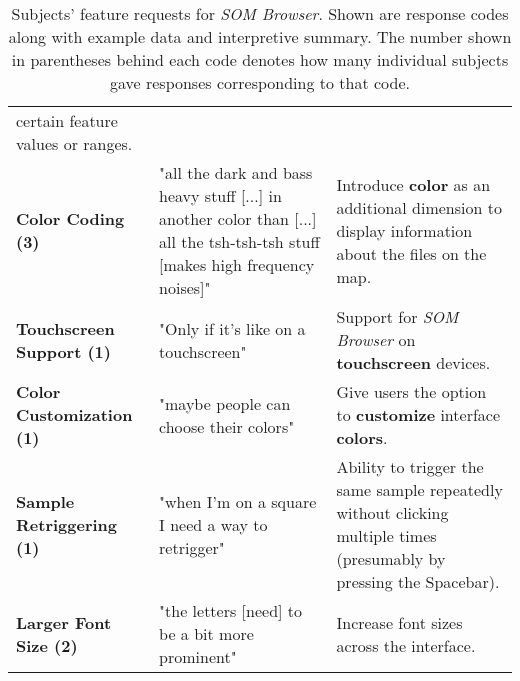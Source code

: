 \begin{table}[!htb]
{\begin{tabular}{ p{4.0cm} p{4.75cm} p{4.75cm} }
    certain feature values or ranges.
    \\
    \textbf{Color Coding (3)}
    &
    "all the dark and bass heavy stuff [...] in another color than [...] all the
    tsh-tsh-tsh stuff [makes high frequency noises]"
    &
    Introduce \textbf{color} as an additional dimension to display information
    about the files on the map.
    \\
    \textbf{Touchscreen Support (1)}
    &
    "Only if it's like on a touchscreen"
    &
    Support for \textit{SOM Browser} on \textbf{touchscreen} devices.
    \\
    \textbf{Color Customization (1)}
    &
    "maybe people can choose their colors"
    &
    Give users the option to \textbf{customize} interface \textbf{colors}.
    \\
    \textbf{Sample Retriggering (1)}
    &
    "when I'm on a square I need a way to retrigger"
    &
    Ability to trigger the same sample repeatedly without clicking multiple
    times (presumably by pressing the Spacebar).
    \\
    \textbf{Larger Font Size (2)}
    &
    "the letters [need] to be a bit more prominent"
    &
    Increase font sizes across the interface.
    \\
  \end{tabular}}
  \caption[SOM Browser: Feature Requests]{Subjects' feature requests for
  \textit{SOM Browser}. Shown are response codes along with example data and
  interpretive summary. The number shown in parentheses behind each code denotes
  how many individual subjects gave responses corresponding to that code.}
  \label{table:responses_feature_requests}
\end{table}
